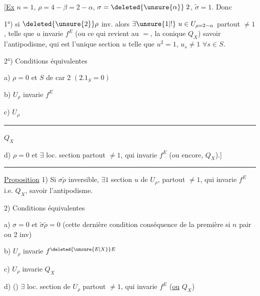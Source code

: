 [\uline{Ex} $n=1$, $\rho=4-\beta=2-\alpha$, $\sigma=\deleted{\unsure{\alpha}}\;2$, $\widetilde\sigma=1$. Donc

 1°) si $\deleted{\unsure{2}}\rho$ inv.  alors $\exists\unsure{1|!}\ u\in U_{\rho=2-\alpha}$ partout $\ne1$, telle que $u$ invarie $f^E$ (ou ce qui revient au $=$,  la conique $Q_X$) savoir l'antipodisme, qui est l'unique section $u$ telle que $u^2=1$, $u_s\ne1$ $\forall s\in S$.

2°) Conditions équivalentes

a) $\rho=0$ et  $S$ de car 2 $(2.1_S=0)$

b) $U_\rho$ invarie $f^E$

c) $U_\rho$ \rule{1.5cm}{0.35pt} $Q_X$

d) $\rho=0$ et $\exists$ loc. section partout $\ne1$, qui invarie $f^E$ (ou encore, $Q_X$).]

\begin{center}\rule{4cm}{0.35pt}\end{center}

\uline{Proposition} 1) Si $\sigma\widetilde\rho$ inversible, $\exists1$ section $u$ de $U_\rho$, partout $\ne1$, qui invarie $f^E$ i.e. $Q_X$, savoir l'antipodisme.

2) Conditions équivalentes

a) $\sigma=0$ et $\widetilde\sigma\widetilde\rho=0$ (cette dernière condition conséquence de la première si $n$ pair ou 2 inv)

b) $U_\rho$ invarie $f^{\deleted{\unsure{E|X}}E}$

c) $U_\rho$ invarie $Q_X$

d) () $\exists$ loc. section de $U_\rho$ partout $\ne1$, qui invarie $f^E$ (\uline{ou} $Q_X$)
